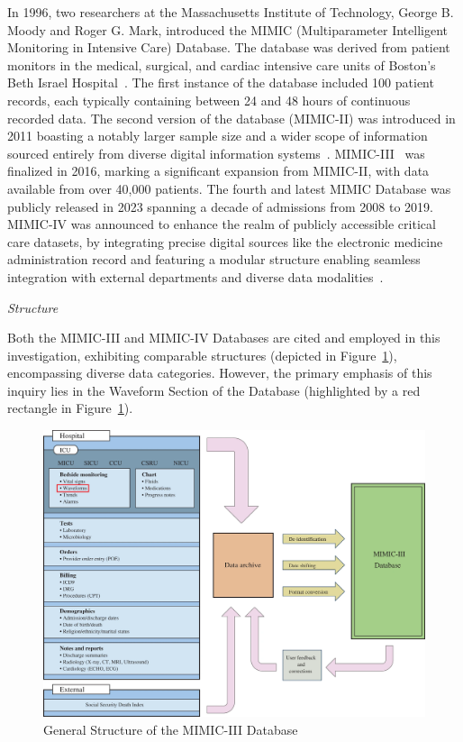In 1996, two researchers at the Massachusetts Institute of Technology, George B. Moody and Roger G. Mark, introduced the MIMIC (Multiparameter Intelligent Monitoring in Intensive Care) Database.
The database was derived from patient monitors in the medical, surgical, and cardiac intensive care units of Boston’s Beth Israel Hospital~\cite{moodyDatabaseSupportDevelopment1996}.
The first instance of the database included 100 patient records, each typically containing between 24 and 48 hours of continuous recorded data.
The second version of the database (MIMIC-II) was introduced in 2011 boasting a notably larger sample size and a wider scope of information sourced entirely from diverse digital information systems~\cite{saeedMultiparameterIntelligentMonitoring2011}.
MIMIC-III~\cite{johnsonMIMICIIIFreelyAccessible2016} was finalized in 2016, marking a significant expansion from MIMIC-II, with data available from over 40,000 patients.
The fourth and latest MIMIC Database was publicly released in 2023 spanning a decade of admissions from 2008 to 2019.
MIMIC-IV was announced to enhance the realm of publicly accessible critical care datasets, by integrating precise digital sources like the electronic medicine administration record and featuring a modular structure enabling seamless integration with external departments and diverse data modalities~\cite{johnsonMIMICIVFreelyAccessible2023}.

\vspace{0.2cm}
\textit{Structure}
\vspace{0.2cm}

Both the MIMIC-III and MIMIC-IV Databases are cited and employed in this investigation, exhibiting comparable structures (depicted in Figure~\ref{fig:mimic_structure}), encompassing diverse data categories.
However, the primary emphasis of this inquiry lies in the Waveform Section of the Database (highlighted by a red rectangle in Figure~\ref{fig:mimic_structure}).

\begin{figure}[h]
    \centering
    \includegraphics[scale=0.3]{images/mimic/mimic_structure}
    \caption{General Structure of the MIMIC-III Database~\cite{johnsonMIMICIIIFreelyAccessible2016}}
    \label{fig:mimic_structure}
\end{figure}

